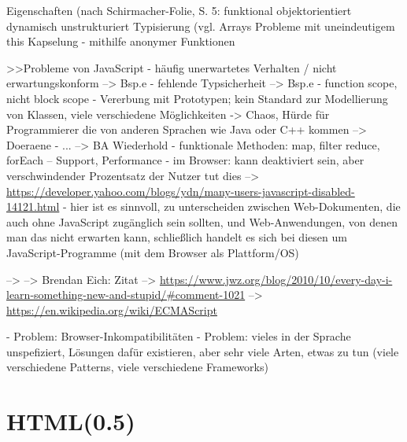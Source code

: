 \documentclass[a4paper, 12pt, listof=totoc, bibliography=totoc]{scrreprt}
\begin{document}
Eigenschaften (nach Schirmacher-Folie, S. 5: %
	funktional
	objektorientiert
	dynamisch
	unstrukturiert
	Typisierung (vgl. %
	Arrays
	Probleme mit uneindeutigem this
	Kapselung - mithilfe anonymer Funktionen
	
                             
>>Probleme von JavaScript
- häufig unerwartetes Verhalten / nicht erwartungskonform  -->  Bsp.e
- fehlende Typsicherheit  -->  Bsp.e
- function scope, nicht block scope
- Vererbung mit Prototypen; kein Standard zur Modellierung von Klassen, viele verschiedene Möglichkeiten  ->  Chaos, Hürde für Programmierer die von anderen Sprachen wie Java oder C++ kommen
-->  Doeraene
- ...
-->  BA Wiederhold
- funktionale Methoden: map, filter reduce, forEach -- Support, Performance
- im Browser: kann deaktiviert sein, aber verschwindender Prozentsatz der Nutzer tut dies  -->  \url{https://developer.yahoo.com/blogs/ydn/many-users-javascript-disabled-14121.html}
	- hier ist es sinnvoll, zu unterscheiden zwischen Web-Dokumenten, die auch ohne JavaScript zugänglich sein sollten, und Web-Anwendungen, von denen man das nicht erwarten kann, schließlich handelt es sich bei diesen um JavaScript-Programme (mit dem Browser als Plattform/OS)
	\cite[S.311]{flanagan2011.JDG}

-->  \cite{flanagan2011.JDG}
-->  \cite{crockford2008.JSG}
Brendan Eich: Zitat  -->  \url{https://www.jwz.org/blog/2010/10/every-day-i-learn-something-new-and-stupid/#comment-1021}
-->  \url{https://en.wikipedia.org/wiki/ECMAScript}

- Problem: Browser-Inkompatibilitäten
- Problem: vieles in der Sprache unspefiziert, Lösungen dafür existieren, aber sehr viele Arten, etwas zu tun (viele verschiedene Patterns, viele verschiedene Frameworks)


\section{HTML(0.5)}

\end{document}
